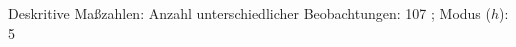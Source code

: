 				\label{tableValues:asys04}
				\vspace*{-\baselineskip}
                    \begin{noten}
                	    \note{} Deskritive Maßzahlen:
                	    Anzahl unterschiedlicher Beobachtungen: 107%
                	    ; 
                	      Modus ($h$): 5
                     \end{noten}


